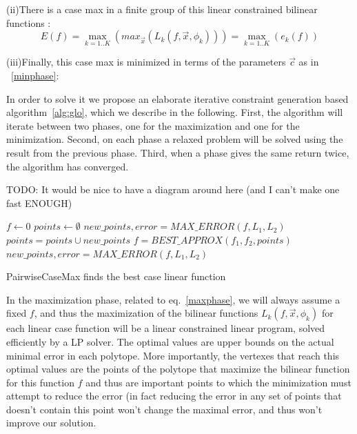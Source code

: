 (ii)There is a case max in a finite group of this linear constrained bilinear functions :
\begin{equation} E(f) = \max_{k=1..K} ( max_{\vec{x}} ( L_k(f,\vec{x},\phi_k) )) = \max_{k=1..K} ( e_k(f)) \label{step2}  \nonumber \end{equation}

(iii)Finally, this case max is minimized in terms of the parameters $\vec{c}$ as in ~\ref{minphase}:

In order to solve it we propose an elaborate iterative constraint generation based algorithm~\ref{alg:glo}, which we describe in the following.
First, the algorithm will iterate between two phases, one for the maximization and one for the minimization.  Second, on each phase a relaxed problem will be solved using the result from the previous phase. Third, when a phase gives the same return twice, the algorithm has converged.

TODO: It would be nice to have a diagram around here (and I can't make one fast ENOUGH)

\begin{algorithm}[!h]
\dontprintsemicolon
{}
$f \gets 0$\;
$points \gets \emptyset$\;
$new\_points, error = MAX\_ERROR(f, L_1,L_2)$\;
 {
	$points = points \cup new\_points$\;
	$f = BEST\_APPROX(f_1,f_2,points)$\;
	$new\_points, error = MAX\_ERROR(f, L_1,L_2)$\;}
\;
\caption{{\sc PairwiseCaseMax} finds the best case linear function}
\label{alg:glo}
\end{algorithm}


In the maximization phase, related to eq.~\ref{maxphase}, we will always assume a fixed $f$, and thus the maximization of the bilinear functions $L_{k}(f,\vec{x},\phi_k)$ for each linear case function will be a linear constrained linear program, solved efficiently by a LP solver. The optimal values are upper bounds on the actual minimal error in each polytope. More importantly, the vertexes that reach this optimal values are the points of the polytope that maximize the bilinear function for this function $f$ and thus are important points to which the minimization must attempt to reduce the error (in fact reducing the error in any set of points that doesn't contain this point won't change the maximal error, and thus won't improve our solution.


